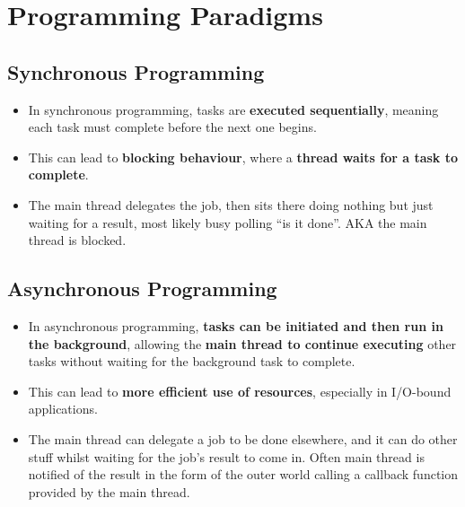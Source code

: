 \documentclass{article}
\begin{document}
\section{Programming Paradigms}
\subsection{Synchronous Programming}
\begin{itemize}
  \item In synchronous programming, tasks are \textbf{executed sequentially}, meaning each task must complete before the next one begins.
  \item This can lead to \textbf{blocking behaviour}, where a \textbf{thread waits for a task to complete}.
  \item The main thread delegates the job, then sits there doing nothing but just waiting for a result, most likely busy polling ``is it done''. AKA the main thread is blocked.
\end{itemize}
\subsection{Asynchronous Programming}
\begin{itemize}
  \item In asynchronous programming, \textbf{tasks can be initiated and then run in the background}, allowing the \textbf{main thread to continue executing} other tasks without waiting for the background task to complete.
  \item This can lead to \textbf{more efficient use of resources}, especially in I/O-bound applications.
  \item The main thread can delegate a job to be done elsewhere, and it can do other stuff whilst waiting for the job's result to come in. Often main thread is notified of the result in the form of the outer world calling a callback function provided by the main thread.
\end{itemize}
\end{document}
